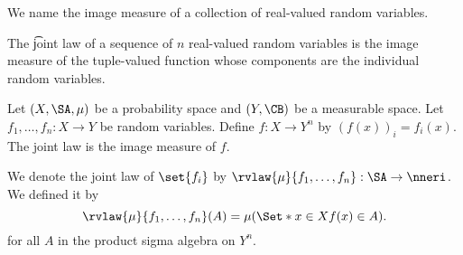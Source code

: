 

We name the image measure of a collection of real-valued random variables.


The \t{joint law} of a sequence of $n$ real-valued random variables is the image measure of the tuple-valued function whose components are the individual random variables.


Let $(X, \SA, \mu)$ be a probability space and $(Y, \CB)$ be a measurable space.
Let $f_1, \dots, f_n: X \to Y$ be random variables.
Define $f: X \to Y^n$ by $(f(x))_i = f_i(x)$.
The joint law is the image measure of $f$.

We denote the joint law of $\set{f_i}$ by $\rvlaw{\mu}{f_1, \dots, f_n}: \SA \to \nneri$.
We defined it by
\[
  \rvlaw{\mu}{f_1, \dots, f_n}(A)
  = \mu(\Set*{x \in X}{f(x) \in A}).
\]
for all $A$ in the product sigma algebra on $Y^n$.

\blankpage
